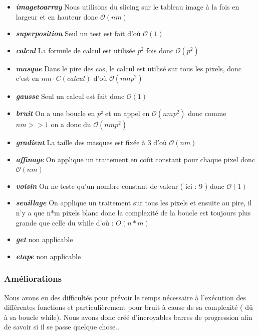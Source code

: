 \documentclass[hidelinks,11pt]{article}
\theoremstyle{mytheoremstyle}
\theoremstyle{mytheoremstyle}
\theoremstyle{myproblemstyle}
\begin{document}
    \begin{itemize}
        \item \textit{\textbf{image\textunderscore to\textunderscore array}} Nous utilisons du slicing sur le tableau image à la fois en largeur et en hauteur donc $\mathcal{O}(nm)$
        \item \textit{\textbf{superposition}} Seul un test est fait d'où $\mathcal{O}(1)$
        \item \textit{\textbf{calcul}} La formule de calcul est utilisée $p^2$ fois donc $\mathcal{O}(p^2)$
        \item \textit{\textbf{masque}} Dans le pire des cas, le calcul est utilisé sur tous les pixels, donc c’est en $nm\cdot C(calcul)$ d'où $\mathcal{O}(nmp^2)$
        \item \textit{\textbf{\textit{gausse}}} Seul un calcul est fait donc $\mathcal{O}(1)$
        \item \textit{\textbf{bruit}} On a une boucle en $p²$ et un appel en $\mathcal{O}(nmp^2)$ donc comme $nm >> 1$ on a donc du $\mathcal{O}(nmp^2)$
        \item \textbf{\textit{gradient}} La taille des masques est fixée à 3 d'où $\mathcal{O}(nm)$
        \item \textbf{\textit{affinage}} On applique un traitement en coût constant pour chaque pixel donc $\mathcal{O}(nm)$
        \item \textit{\textbf{voisin}} On ne teste qu’un nombre constant de valeur ( ici : 9 ) donc $\mathcal{O}(1)$
        \item \textit{\textbf{seuillage}} On applique un traitement sur tous les pixels et ensuite au pire, il n’y a que n*m pixels blanc donc la complexité de la boucle est toujours plus grande que celle du while d’où : $O(n*m)$
        \item \textit{\textbf{get}} non applicable
        \item \textit{\textbf{etape}} non applicable
    \end{itemize}
    \boldmath
    \subsubsection{Améliorations}

    Nous avons eu des difficultés pour prévoir le temps nécessaire à l'exécution des différentes fonctions et 
    particulièrement pour bruit à cause de sa complexité ( dû à sa boucle while). Nous avons donc créé d’incroyables 
    barres de progression afin de savoir si il se passe quelque chose..\newline
\end{document}
